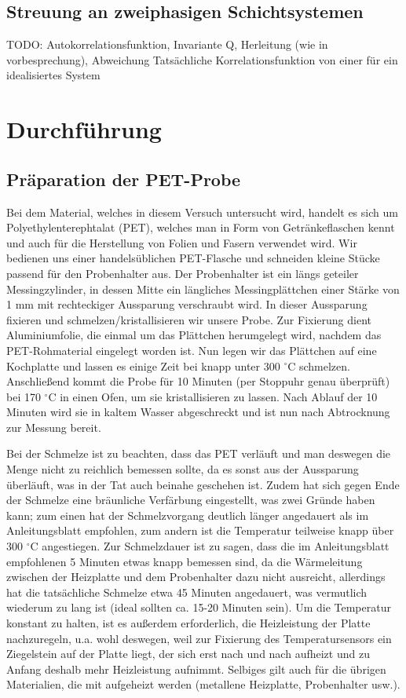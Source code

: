 \documentclass[bigchapter,colorback,accentcolor=tud4b,linedtoc,11pt]{tudreport}
\begin{document}
\section{Streuung an zweiphasigen Schichtsystemen}
TODO: Autokorrelationsfunktion, Invariante Q, Herleitung (wie in vorbesprechung), Abweichung Tatsächliche Korrelationsfunktion von einer für ein idealisiertes System


\chapter{Durchführung}
\section{Präparation der PET-Probe}

Bei dem Material, welches in diesem Versuch untersucht wird, handelt es sich um Polyethylenterephtalat (PET), welches man in Form von Getränkeflaschen kennt und auch für die Herstellung von Folien und Fasern verwendet wird. Wir bedienen uns einer handelsüblichen PET-Flasche und schneiden kleine Stücke passend für den Probenhalter aus. Der Probenhalter ist ein längs geteiler Messingzylinder, in dessen Mitte ein längliches Messingplättchen einer Stärke von 1 mm mit rechteckiger Aussparung verschraubt wird. In dieser Aussparung fixieren und schmelzen/kristallisieren wir unsere Probe. Zur Fixierung dient Aluminiumfolie, die einmal um das Plättchen herumgelegt wird, nachdem das PET-Rohmaterial eingelegt worden ist. Nun legen wir das Plättchen auf eine Kochplatte und lassen es einige Zeit bei knapp unter 300 $^{\circ}$C schmelzen. Anschließend kommt die Probe für 10 Minuten (per Stoppuhr genau überprüft) bei 170 $^{\circ}$C in einen Ofen, um sie kristallisieren zu lassen. Nach Ablauf der 10 Minuten wird sie in kaltem Wasser abgeschreckt und ist nun nach Abtrocknung zur Messung bereit. 

Bei der Schmelze ist zu beachten, dass das PET verläuft und man deswegen die Menge nicht zu reichlich bemessen sollte, da es sonst aus der Aussparung überläuft, was in der Tat auch beinahe geschehen ist. Zudem hat sich gegen Ende der Schmelze eine bräunliche Verfärbung eingestellt, was zwei Gründe haben kann; zum einen hat der Schmelzvorgang deutlich länger angedauert als im Anleitungsblatt empfohlen, zum andern ist die Temperatur teilweise knapp über 300 $^{\circ}$C angestiegen. Zur Schmelzdauer ist zu sagen, dass die im Anleitungsblatt empfohlenen 5 Minuten etwas knapp bemessen sind, da die Wärmeleitung zwischen der Heizplatte und dem Probenhalter dazu nicht ausreicht, allerdings hat die tatsächliche Schmelze etwa 45 Minuten angedauert, was vermutlich wiederum zu lang ist (ideal sollten ca. 15-20 Minuten sein). Um die Temperatur konstant zu halten, ist es außerdem erforderlich, die Heizleistung der Platte nachzuregeln, u.a. wohl deswegen, weil zur Fixierung des Temperatursensors ein Ziegelstein auf der Platte liegt, der sich erst nach und nach aufheizt und zu Anfang deshalb mehr Heizleistung aufnimmt. Selbiges gilt auch für die übrigen Materialien, die mit aufgeheizt werden (metallene Heizplatte, Probenhalter usw.).
\end{document}
